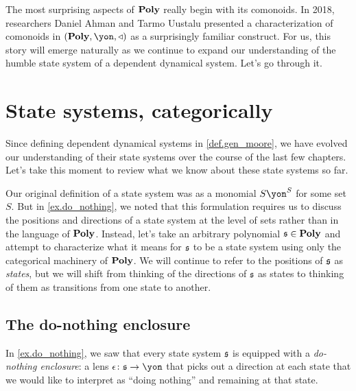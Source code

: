 \documentclass[Book-Poly]{subfiles}
\begin{document}

The most surprising aspects of $\mathbf{Poly}$ really begin with its comonoids.
In 2018, researchers Daniel Ahman and Tarmo Uustalu presented a characterization of comonoids in $(\poly,\yon,\tri)$ as a surprisingly familiar construct.
For us, this story will emerge naturally as we continue to expand our understanding of the humble state system of a dependent dynamical system.
Let's go through it.

\section{State systems, categorically}\label{sec.comon.sharp.state}

Since defining dependent dynamical systems in \cref{def.gen_moore}, we have evolved our understanding of their state systems over the course of the last few chapters. 
Let's take this moment to review what we know about these state systems so far. 

Our original definition of a state system was as a monomial $S\yon^S$ for some set $S$.
But in \cref{ex.do_nothing}, we noted that this formulation requires us to discuss the positions and directions of a state system at the level of sets rather than in the language of $\mathbf{Poly}$.
Instead, let's take an arbitrary polynomial $\mathfrak{s}\in\mathbf{Poly}$ and attempt to characterize what it means for $\mathfrak{s}$ to be a state system using only the categorical machinery of $\mathbf{Poly}$.
We will continue to refer to the positions of $\mathfrak{s}$ as \emph{states}, but we will shift from thinking of the directions of $\mathfrak{s}$ as states to thinking of them as transitions from one state to another.

\subsection{The do-nothing enclosure}\label{subsec.comon.sharp.state.nothing}

In \cref{ex.do_nothing}, we saw that every state system $\mathfrak{s}$ is equipped with a \emph{do-nothing enclosure}: a lens $\epsilon\colon\car{s}\to\yon$ that picks out a direction at each state that we would like to interpret as ``doing nothing'' and remaining at that state.
\end{document}
